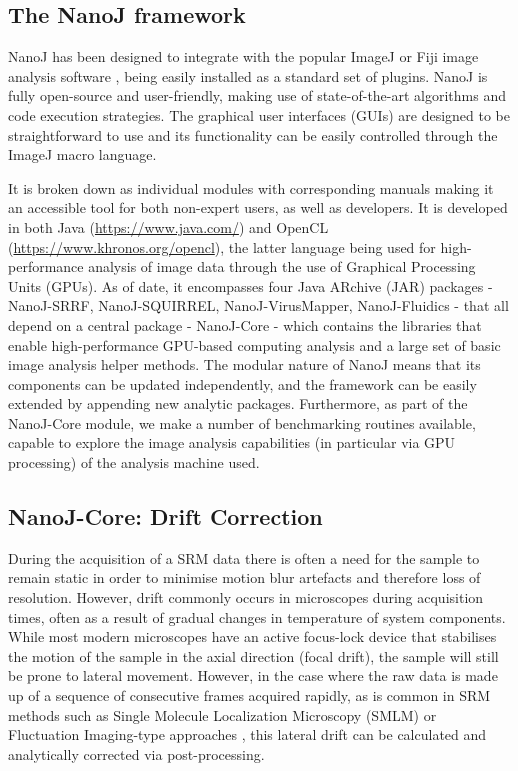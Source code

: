 \subsection*{The NanoJ framework}
NanoJ has been designed to integrate with the popular ImageJ or Fiji image analysis software \cite{abramoff2004image,schindelin2012fiji}, being easily installed as a standard set of plugins. NanoJ is fully open-source and user-friendly, making use of state-of-the-art algorithms and code execution strategies. The graphical user interfaces (GUIs) are designed to be straightforward to use and its functionality can be easily controlled through the ImageJ macro language.

It is broken down as individual modules with corresponding manuals making it an accessible tool for both non-expert users, as well as developers. It is developed in both Java (\href{https://www.java.com/}{https://www.java.com/}) and OpenCL (\href{https://www.khronos.org/opencl}{https://www.khronos.org/opencl}), the latter language being used for high-performance analysis of image data through the use of Graphical Processing Units (GPUs). As of date, it encompasses four Java ARchive (JAR) packages - NanoJ-SRRF, NanoJ-SQUIRREL, NanoJ-VirusMapper, NanoJ-Fluidics - that all depend on a central package - NanoJ-Core - which contains the libraries that enable high-performance GPU-based computing analysis and a large set of basic image analysis helper methods. The modular nature of NanoJ means that its components can be updated independently, and the framework can be easily extended by appending new analytic packages. Furthermore, as part of the NanoJ-Core module, we make a number of benchmarking routines available, capable to explore the image analysis capabilities (in particular via GPU processing) of the analysis machine used.

\subsection*{NanoJ-Core: Drift Correction}
 During the acquisition of a SRM data there is often a need for the sample to remain static in order to minimise motion blur artefacts and therefore loss of resolution. However, drift commonly occurs in microscopes during acquisition times, often as a result of gradual changes in temperature of system components. While most modern microscopes have an active focus-lock device that stabilises the motion of the sample in the axial direction (focal drift), the sample will still be prone to lateral movement. However, in the case where the raw data is made up of a sequence of consecutive frames acquired rapidly, as is common in SRM methods such as Single Molecule Localization Microscopy (SMLM) \cite{betzig2006imaging,rust2006sub} or Fluctuation Imaging-type approaches \cite{gustafsson2016fast,dertinger2009fast,cox2012bayesian}, this lateral drift can be calculated and analytically corrected via post-processing.

